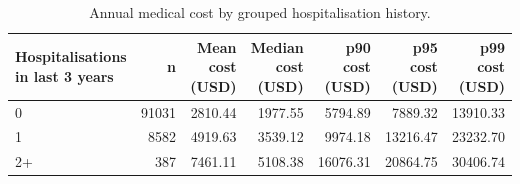 \begin{table}
\caption{Annual medical cost by grouped hospitalisation history.}
\label{tab:01-hospitalisation-grouped-summary}
\begin{tabular}{lrrrrrr}
\toprule
Hospitalisations in last 3 years & n & Mean cost (USD) & Median cost (USD) & p90 cost (USD) & p95 cost (USD) & p99 cost (USD) \\
\midrule
0 & 91031 & 2810.44 & 1977.55 & 5794.89 & 7889.32 & 13910.33 \\
1 & 8582 & 4919.63 & 3539.12 & 9974.18 & 13216.47 & 23232.70 \\
2+ & 387 & 7461.11 & 5108.38 & 16076.31 & 20864.75 & 30406.74 \\
\bottomrule
\end{tabular}
\end{table}
